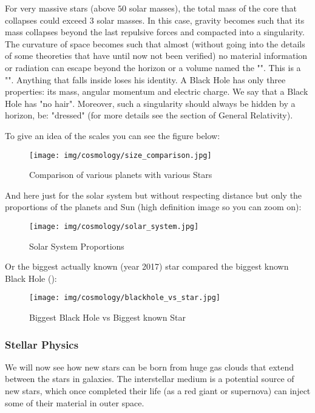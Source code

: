 	For very massive stars (above $50$ solar masses), the total mass of the core that collapses could exceed $3$ solar masses. In this case, gravity becomes such that its mass collapses beyond the last repulsive forces and compacted into a singularity. The curvature of space becomes such that almost (without going into the details of some theoreties that have until now not been verified) no material information or radiation can escape beyond the horizon or a volume named the "". This is a "". Anything that falls inside loses his identity. A Black Hole has only three properties: its mass, angular momentum and electric charge. We say that a Black Hole has "no hair". Moreover, such a singularity should always be hidden by a horizon, be: "dressed" (for more details see the section of General Relativity).
	
	To give an idea of the scales you can see the figure below:
	\begin{figure}[H]
		\begin{center}
		\texttt{[image: img/cosmology/size\_comparison.jpg]}
		\end{center}	
		\caption{Comparison of various planets with various Stars}
	\end{figure}
	And here just for the solar system but without respecting distance but only the proportions of the planets and Sun (high definition image so you can zoom on):
	\begin{figure}[H]
		\begin{center}
		\texttt{[image: img/cosmology/solar\_system.jpg]}
		\end{center}	
		\caption{Solar System Proportions}
	\end{figure}
	Or the biggest actually known (year 2017) star compared the biggest known Black Hole ():
	\begin{figure}[H]
		\begin{center}
		\texttt{[image: img/cosmology/blackhole\_vs\_star.jpg]}
		\end{center}	
		\caption{Biggest Black Hole vs Biggest known Star}
	\end{figure} 
	
	\pagebreak
	\subsubsection{Stellar Physics}
	We will now see how new stars can be born from huge gas clouds that extend between the stars in galaxies. The interstellar medium is a potential source of new stars, which once completed their life (as a red giant or supernova) can inject some of their material in outer space.

